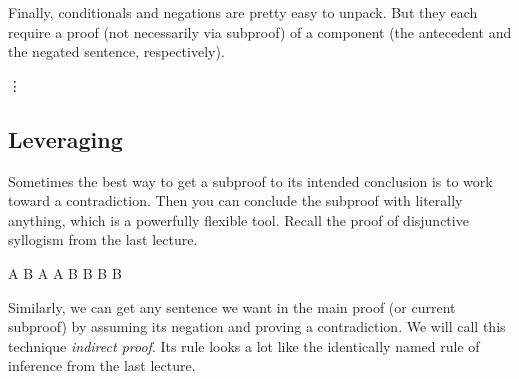 Finally, conditionals and negations are pretty easy to unpack. But they each
require a proof (not necessarily via subproof) of a component (the antecedent
and the negated sentence, respectively).

 {
  
\begin{fitchrule}
  \label{def:unpacking-negations}
  \leavevmode
  \vspace{-0.9\baselineskip}
  \begin{fitchproof}
     {\enot\ephi} 
     {\vdots}
     {\ephi}
     {\ebot} 
  \end{fitchproof}      
\end{fitchrule}

}

\subsection{Leveraging \ebot}

Sometimes the best way to get a subproof to its intended conclusion is to work
toward a contradiction. Then you can conclude the subproof with literally
anything, which is a powerfully flexible tool. Recall the proof of disjunctive
syllogism from the last lecture.

\begin{fitchproof}
   {A \eor B}   
   {\enot A}   
  \open
   {A}
   {\ebot}     
   {B}         
  \close
  \open
   {B}
   {B}         
  \close
   {B}         
\end{fitchproof}      

Similarly, we can get any sentence we want in the main proof (or current
subproof) by assuming its negation and proving a contradiction. We will call
this technique \emph{indirect proof}. Its rule looks a lot like the identically
named rule of inference from the last lecture.

